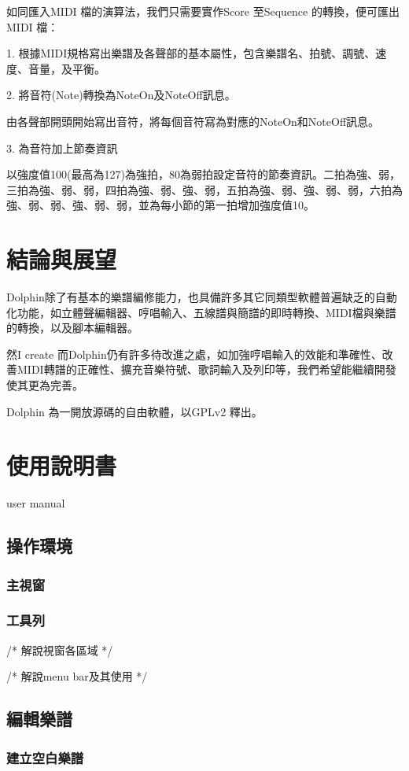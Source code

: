 \documentclass[12pt,a4paper,oneside]{report}
\begin{document}
如同匯入MIDI 檔的演算法，我們只需要實作Score 至Sequence 的轉換，便可匯出MIDI 檔：

1. 根據MIDI規格寫出樂譜及各聲部的基本屬性，包含樂譜名、拍號、調號、速度、音量，及平衡。 

2. 將音符(Note)轉換為NoteOn及NoteOff訊息。 

由各聲部開頭開始寫出音符，將每個音符寫為對應的NoteOn和NoteOff訊息。

3. 為音符加上節奏資訊

以強度值100(最高為127)為強拍，80為弱拍設定音符的節奏資訊。二拍為強、弱，三拍為強、弱、弱，四拍為強、弱、強、弱，五拍為強、弱、強、弱、弱，六拍為強、弱、弱、強、弱、弱，並為每小節的第一拍增加強度值10。



\chapter{結論與展望}

Dolphin除了有基本的樂譜編修能力，也具備許多其它同類型軟體普遍缺乏的自動化功能，如立體聲編輯器、哼唱輸入、五線譜與簡譜的即時轉換、MIDI檔與樂譜的轉換，以及腳本編輯器。

然I create 而Dolphin仍有許多待改進之處，如加強哼唱輸入的效能和準確性、改善MIDI轉譜的正確性、擴充音樂符號、歌詞輸入及列印等，我們希望能繼續開發使其更為完善。

Dolphin 為一開放源碼的自由軟體，以GPLv2 釋出。


\appendix

\chapter{使用說明書} user manual
\section{操作環境}
\subsection{主視窗}
\subsection{工具列}
/* 
解說視窗各區域
*/

/* 
解說menu bar及其使用
*/
\section{編輯樂譜}
   \subsection{建立空白樂譜}
\end{document}
